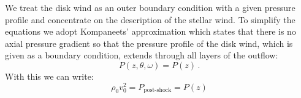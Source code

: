 We treat the disk wind as an outer boundary condition with a given pressure profile and concentrate on the description of the stellar wind. To simplify the equations we adopt Kompaneets' approximation \citep{1960SPhD....5...46K} which states that there is no axial pressure gradient so that the pressure profile of the disk wind, which is given as a boundary condition, extends through all layers of the outflow:
\begin{equation}
P(z,\theta, \omega) = P(z)\,.
\end{equation}
With this we can write:
\begin{equation}
\rho_0 v_0^2 = P_{\textrm{post-shock}} = P(z)
\end{equation}
